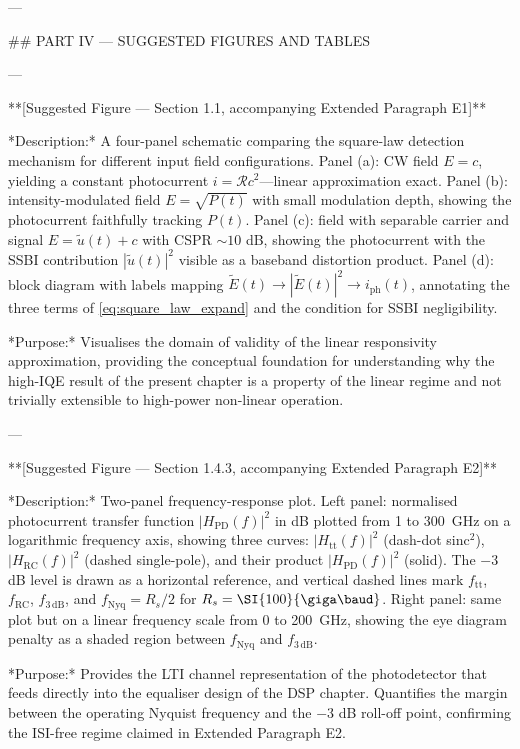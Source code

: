 ---

## PART IV — SUGGESTED FIGURES AND TABLES

---

**[Suggested Figure — Section 1.1, accompanying Extended Paragraph E1]**

*Description:* A four-panel schematic comparing the square-law detection mechanism for different input field configurations. Panel (a): CW field $E = c$, yielding a constant photocurrent $i = \mathcal{R}c^2$—linear approximation exact. Panel (b): intensity-modulated field $E = \sqrt{P(t)}$ with small modulation depth, showing the photocurrent faithfully tracking $P(t)$. Panel (c): field with separable carrier and signal $E = \tilde{u}(t) + c$ with CSPR $\sim 10$ dB, showing the photocurrent with the SSBI contribution $|\tilde{u}(t)|^2$ visible as a baseband distortion product. Panel (d): block diagram with labels mapping $\tilde{E}(t) \to |\tilde{E}(t)|^2 \to i_\mathrm{ph}(t)$, annotating the three terms of \cref{eq:square_law_expand} and the condition for SSBI negligibility.

*Purpose:* Visualises the domain of validity of the linear responsivity approximation, providing the conceptual foundation for understanding why the high-IQE result of the present chapter is a property of the linear regime and not trivially extensible to high-power non-linear operation.

---

**[Suggested Figure — Section 1.4.3, accompanying Extended Paragraph E2]**

*Description:* Two-panel frequency-response plot. Left panel: normalised photocurrent transfer function $|H_\mathrm{PD}(f)|^2$ in dB plotted from 1 to \SI{300}{\giga\hertz} on a logarithmic frequency axis, showing three curves: $|H_\mathrm{tt}(f)|^2$ (dash-dot sinc$^2$), $|H_\mathrm{RC}(f)|^2$ (dashed single-pole), and their product $|H_\mathrm{PD}(f)|^2$ (solid). The $-3$ dB level is drawn as a horizontal reference, and vertical dashed lines mark $f_\mathrm{tt}$, $f_\mathrm{RC}$, $f_{3\,\mathrm{dB}}$, and $f_\mathrm{Nyq} = R_s/2$ for $R_s = \SI{100}{\giga\baud}$. Right panel: same plot but on a linear frequency scale from 0 to \SI{200}{\giga\hertz}, showing the eye diagram penalty as a shaded region between $f_\mathrm{Nyq}$ and $f_{3\,\mathrm{dB}}$.

*Purpose:* Provides the LTI channel representation of the photodetector that feeds directly into the equaliser design of the DSP chapter. Quantifies the margin between the operating Nyquist frequency and the $-3$ dB roll-off point, confirming the ISI-free regime claimed in Extended Paragraph E2.

